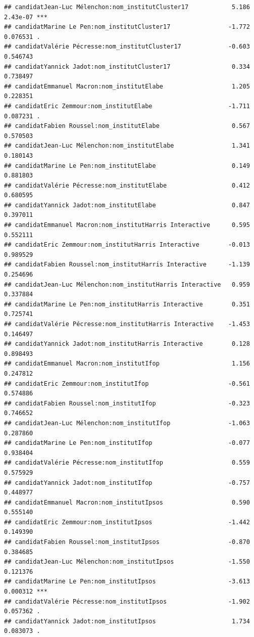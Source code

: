 \documentclass[
]{book}
\begin{document}
\begin{verbatim}
## candidatJean-Luc Mélenchon:nom_institutCluster17            5.186 2.43e-07 ***
## candidatMarine Le Pen:nom_institutCluster17                -1.772 0.076531 .  
## candidatValérie Pécresse:nom_institutCluster17             -0.603 0.546743    
## candidatYannick Jadot:nom_institutCluster17                 0.334 0.738497    
## candidatEmmanuel Macron:nom_institutElabe                   1.205 0.228351    
## candidatEric Zemmour:nom_institutElabe                     -1.711 0.087231 .  
## candidatFabien Roussel:nom_institutElabe                    0.567 0.570503    
## candidatJean-Luc Mélenchon:nom_institutElabe                1.341 0.180143    
## candidatMarine Le Pen:nom_institutElabe                     0.149 0.881803    
## candidatValérie Pécresse:nom_institutElabe                  0.412 0.680595    
## candidatYannick Jadot:nom_institutElabe                     0.847 0.397011    
## candidatEmmanuel Macron:nom_institutHarris Interactive      0.595 0.552111    
## candidatEric Zemmour:nom_institutHarris Interactive        -0.013 0.989529    
## candidatFabien Roussel:nom_institutHarris Interactive      -1.139 0.254696    
## candidatJean-Luc Mélenchon:nom_institutHarris Interactive   0.959 0.337884    
## candidatMarine Le Pen:nom_institutHarris Interactive        0.351 0.725741    
## candidatValérie Pécresse:nom_institutHarris Interactive    -1.453 0.146497    
## candidatYannick Jadot:nom_institutHarris Interactive        0.128 0.898493    
## candidatEmmanuel Macron:nom_institutIfop                    1.156 0.247812    
## candidatEric Zemmour:nom_institutIfop                      -0.561 0.574886    
## candidatFabien Roussel:nom_institutIfop                    -0.323 0.746652    
## candidatJean-Luc Mélenchon:nom_institutIfop                -1.063 0.287860    
## candidatMarine Le Pen:nom_institutIfop                     -0.077 0.938404    
## candidatValérie Pécresse:nom_institutIfop                   0.559 0.575929    
## candidatYannick Jadot:nom_institutIfop                     -0.757 0.448977    
## candidatEmmanuel Macron:nom_institutIpsos                   0.590 0.555140    
## candidatEric Zemmour:nom_institutIpsos                     -1.442 0.149390    
## candidatFabien Roussel:nom_institutIpsos                   -0.870 0.384685    
## candidatJean-Luc Mélenchon:nom_institutIpsos               -1.550 0.121376    
## candidatMarine Le Pen:nom_institutIpsos                    -3.613 0.000312 ***
## candidatValérie Pécresse:nom_institutIpsos                 -1.902 0.057362 .  
## candidatYannick Jadot:nom_institutIpsos                     1.734 0.083073 .  

\end{verbatim}
\end{document}
